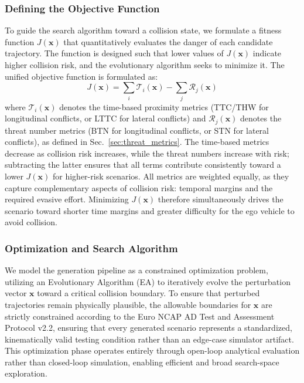\subsubsection{Defining the Objective Function}\label{sec:objective}
To guide the search algorithm toward a collision state, we formulate a fitness function $J(\mathbf{x})$ that quantitatively evaluates the danger of each candidate trajectory. The function is designed such that lower values of $J(\mathbf{x})$ indicate higher collision risk, and the evolutionary algorithm seeks to minimize it. The unified objective function is formulated as:
\begin{equation}
    J(\mathbf{x}) = \sum_{i} \mathcal{T}_{i}(\mathbf{x}) - \sum_{j} \mathcal{R}_{j}(\mathbf{x})
\end{equation}
where $\mathcal{T}_{i}(\mathbf{x})$ denotes the time-based proximity metrics (TTC/THW for longitudinal conflicts, or LTTC for lateral conflicts) and $\mathcal{R}_{j}(\mathbf{x})$ denotes the threat number metrics (BTN for longitudinal conflicts, or STN for lateral conflicts), as defined in Sec.~\ref{sec:threat_metrics}. The time-based metrics decrease as collision risk increases, while the threat numbers increase with risk; subtracting the latter ensures that all terms contribute consistently toward a lower $J(\mathbf{x})$ for higher-risk scenarios. All metrics are weighted equally, as they capture complementary aspects of collision risk: temporal margins and the required evasive effort. Minimizing $J(\mathbf{x})$ therefore simultaneously drives the scenario toward shorter time margins and greater difficulty for the ego vehicle to avoid collision.

\subsubsection{Optimization and Search Algorithm}\label{sec:optimization}
We model the generation pipeline as a constrained optimization problem, utilizing an Evolutionary Algorithm (EA) to iteratively evolve the perturbation vector $\mathbf{x}$ toward a critical collision boundary. To ensure that perturbed trajectories remain physically plausible, the allowable boundaries for $\mathbf{x}$ are strictly constrained according to the Euro NCAP AD Test and Assessment Protocol v2.2, ensuring that every generated scenario represents a standardized, kinematically valid testing condition rather than an edge-case simulator artifact. This optimization phase operates entirely through open-loop analytical evaluation rather than closed-loop simulation, enabling efficient and broad search-space exploration.

